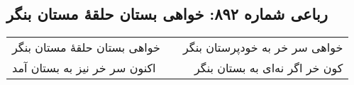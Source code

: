 \begin{center}
\section*{رباعی شماره ۸۹۲: خواهی بستان حلقهٔ مستان بنگر}
\label{sec:0892}
\begin{longtable}{l p{0.5cm} r}
خواهی بستان حلقهٔ مستان بنگر
&&
خواهی سر خر به خودپرستان بنگر
\\
اکنون سر خر نیز به بستان آمد
&&
کون خر اگر نه‌ای به بستان بنگر
\\
\end{longtable}
\end{center}
